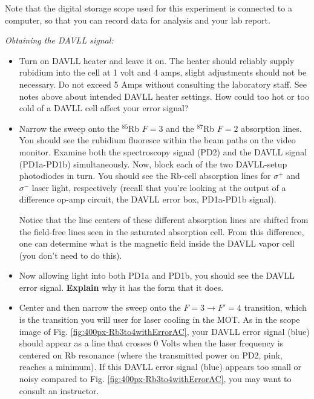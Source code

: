 \documentclass{../lab}
\begin{document}

Note that the digital storage scope used for this experiment is connected to a computer, so that you can record data for analysis and your lab report.

\emph{Obtaining the DAVLL signal:}

\begin{itemize}
    \item Turn on DAVLL heater and leave it on. The heater should reliably supply rubidium into the cell at 1 volt and 4 amps, slight adjustments should not be necessary. Do not exceed 5 Amps without consulting the laboratory staff. See notes above about intended DAVLL heater settings. How could too hot or too cold of a DAVLL cell affect your error signal?

    \item Narrow the sweep onto the $^{85}$Rb $F=3 $ and the $^{87}$Rb $F=2 $ absorption lines. You should see the rubidium fluoresce within the beam paths on the video monitor. Examine both the spectroscopy signal (PD2) and the DAVLL signal (PD1a-PD1b) simultaneously. Now, block each of the two DAVLL-setup photodiodes in turn. You should see the Rb-cell absorption lines for $\sigma^+ $ and $\sigma^-$ laser light, respectively (recall that you're looking at the output of a difference op-amp circuit, the DAVLL error box, PD1a-PD1b signal). 
    
    Notice that the line centers of these different absorption lines are shifted from the field-free lines seen in the saturated absorption cell. From this difference, one can determine what is the magnetic field inside the DAVLL vapor cell (you don't need to do this).

    \item Now allowing light into both PD1a and PD1b, you should see the DAVLL error signal. \textbf{Explain} why it has the form that it does.

    \item Center and then narrow the sweep onto the $F = 3 \rightarrow F' = 4 $ transition, which is the transition you will user for laser cooling in the MOT. As in the scope image of Fig. \ref{fig:400px-Rb3to4withErrorAC}, your DAVLL error signal (blue) should appear as a line that crosses 0 Volts when the laser frequency is centered on Rb resonance (where the transmitted power on PD2, pink, reaches a minimum). If this DAVLL error signal (blue) appears too small or noisy compared to Fig. \ref{fig:400px-Rb3to4withErrorAC}, you may want to consult an instructor.
\end{itemize}
\end{document}
